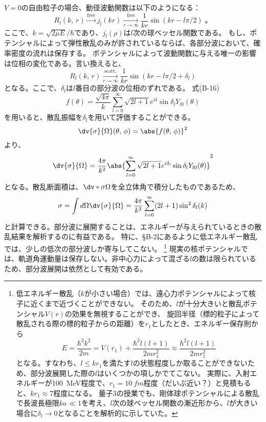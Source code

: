 \documentclass[a4paper,11pt,uplatex]{jsarticle}
\begin{document}
$V=0$の自由粒子の場合、動径波動関数は以下のようになる：
\begin{equation}
  R_l(k,\,r)\xrightarrow[]{\text{free}} j_l(kr)\xrightarrow[r\to\infty]{\text{free}} \frac{1}{kr}\sin(kr-l\pi/2)\;。
\end{equation}
ここで、$k=\sqrt{2\mu E}/\hbar$であり、$j_l(\rho)$は$l$次の球ベッセル関数である。
もし、ポテンシャルによって弾性散乱のみが許されているならば、各部分波において、確率密度の流れは保存する。
ポテンシャルによって波動関数に与える唯一の影響は位相の変化である。言い換えると、
\begin{equation}
  R_l(k,\,r)\xrightarrow[r\to\infty]{\text{scatt.}} \frac{1}{kr}\sin(kr-l\pi/2+\delta_l)
\end{equation}
となる。ここで、$\delta_l$は$l$番目の部分波の位相のずれである。
式(B-16)
\begin{equation}
  f(\theta)=\frac{\sqrt{4\pi}}{k}\sum_{l=0}^{\infty}\sqrt{2l+1}e^{i\delta}\sin\delta_l Y_{l0}(\theta)
\end{equation}
を用いると、散乱振幅を$\delta_l$を用いて評価することができる。
\begin{equation}
  \dv{\sigma}{\Omega}(\theta,\,\phi)=\abs{f(\theta,\,\phi)}^2
\end{equation}
より、
\begin{equation}
  \dv{\sigma}{\Omega} = \frac{4\pi}{k^2}\abs{\sum_{l=0}^{\infty}\sqrt{2l+1}e^{i\delta_l}\sin\delta_l Y_{l0}(\theta)}^2
\end{equation}
となる。散乱断面積は、$\dv*{\sigma}{\Omega}$を全立体角で積分したものであるため、
\begin{equation}
  \sigma=\int d\Omega \dv{\sigma}{\Omega} = \frac{4\pi}{k^2}\sum_{l=0}^{\infty}(2l+1)\sin^2\delta_l(k)
\end{equation}
と計算できる。部分波に展開することは、エネルギーが与えられているときの散乱結果を解析するのに有益である。
特に、\S{B-2}にあるように低エネルギー散乱では、少しの低次の部分波しか寄与してこない。
\footnote{低エネルギー散乱（$k$が小さい場合）では、遠心力ポテンシャルによって核子に近くまで近づくことができない。
  そのため、$l$が十分大きいと散乱ポテンシャル$V(r)$の効果を無視することができ、
  旋回半径（標的粒子によって散乱される際の標的粒子からの距離）を$r_1$としたとき、エネルギー保存則から
  \begin{equation}
    E=\frac{\hbar^2k^2}{2m} = V(r_1)+ \frac{\hbar^2l(l+1)}{2mr_1^2} \approx \frac{\hbar^2l(l+1)}{2mr_1^2}
  \end{equation}
  となる。すなわち、$l\leq kr_1$を満たす$l$の状態程度しか取ることができないため、部分波展開した際の$l$はいくつかの項しかでてこない。
  実際に、入射エネルギーが\SI{100}{MeV}程度で、$r_1=\SI{10}{fm}$程度（だいぶ近い？）と見積もると、$kr_1\approx 7$程度になる。
  量子3の授業でも、剛体球ポテンシャルによる散乱で長波長極限$ka\ll 1$を考え、$l$次の球ベッセル関数の漸近形から、$l$が大きい場合に$\delta_l\to0$となることを解析的に示していた。
}
現実の核ポテンシャルでは、軌道角運動量は保存しない。非中心力によって混ざる$l$の数は限られているため、部分波展開は依然として有効である。
\end{document}
